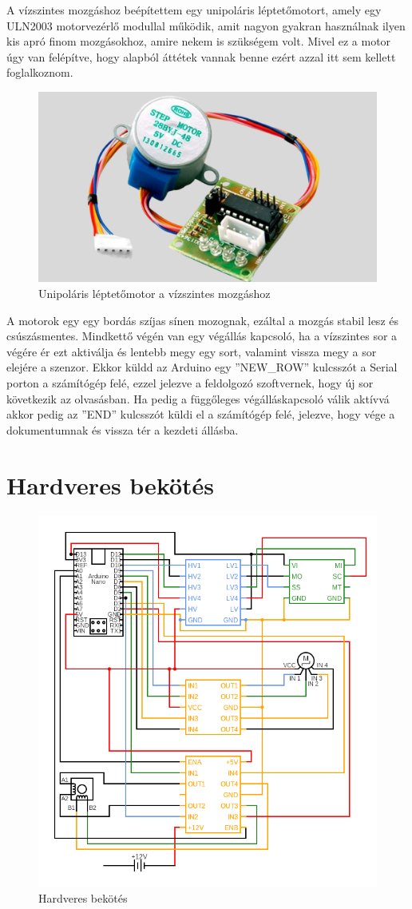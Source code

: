 \documentclass[]{thesis-ekf}
\theoremstyle{definition}
\theoremstyle{remark}
\begin{document}
A vízszintes mozgáshoz beépítettem egy unipoláris léptetőmotort, amely egy ULN2003 motorvezérlő modullal működik, amit nagyon gyakran használnak ilyen kis apró finom mozgásokhoz, amire nekem is szükségem volt. Mivel ez a motor úgy van felépítve, hogy alapból áttétek vannak benne ezért azzal itt sem kellett foglalkoznom. 

\begin{figure}[th!]
	\centering
	\includegraphics[width=0.5\linewidth]{28BYJ-48-modul-ULN2003}
	\caption[Unipoláris léptetőmotor]{Unipoláris léptetőmotor a vízszintes mozgáshoz}
	\label{fig:28byj-48-modul-uln2003}
\end{figure}

 A motorok egy egy bordás szíjas sínen mozognak, ezáltal a mozgás stabil lesz és csúszásmentes. Mindkettő végén van egy végállás kapcsoló, ha a vízszintes sor a végére ér ezt aktiválja és lentebb megy egy sort, valamint vissza megy a sor elejére a szenzor. Ekkor küldd az Arduino egy ''NEW\_ROW'' kulcsszót a Serial porton a számítógép felé, ezzel jelezve a feldolgozó szoftvernek, hogy új sor következik az olvasásban. Ha pedig a függőleges végálláskapcsoló válik aktívvá akkor pedig az ''END'' kulcsszót küldi el a számítógép felé, jelezve, hogy vége a dokumentumnak és vissza tér a kezdeti állásba.

\section{Hardveres bekötés}
\begin{figure}[th!]
	\centering
	\includegraphics[width=0.7\linewidth]{circuit}
	\caption[Hardveres bekötés]{Hardveres bekötés}
	\label{fig:circuit}
\end{figure}
\end{document}
